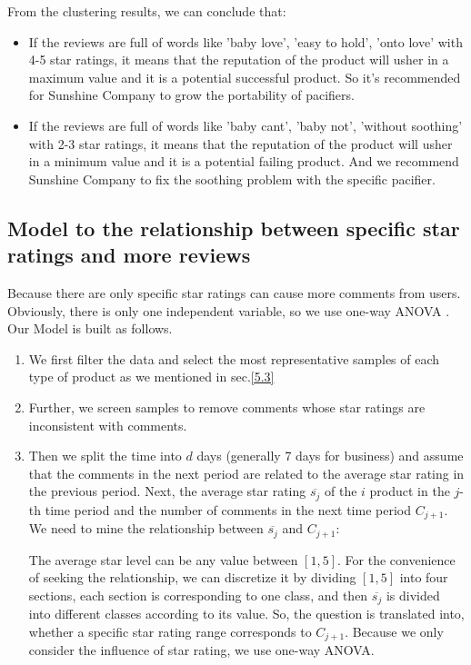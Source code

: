 \documentclass{mcmthesis}
\begin{document}
From the clustering results, we can conclude that:
\begin{itemize}
	\item If the reviews are full of words like 'baby love', 'easy to hold', 'onto love' with 4-5 star ratings, it means that the reputation of the product will usher in a maximum value and it is a potential successful product. So it's recommended for Sunshine Company to grow the portability of pacifiers.
	\item If the reviews are full of words like 'baby cant', 'baby not', 'without soothing' with 2-3 star ratings, it means that the reputation of the product will usher in a minimum value and it is a potential failing product. And we recommend Sunshine Company to fix the soothing problem with the specific pacifier.
\end{itemize}
\subsection{Model to the relationship between specific star ratings and more reviews}
Because there are only specific star ratings can cause more comments from users. Obviously, there is only one independent variable, so we use one-way ANOVA \cite{ross2017one}. Our Model is built as follows.\\
\begin{enumerate}
	\item We first filter the data and select the most representative samples of each type of product as we mentioned in sec.\ref{5.3}
	\item Further, we screen samples to remove comments whose star ratings are inconsistent with comments.
	\item Then we split the time into $d $ days (generally 7 days for business) and assume that the comments in the next period are related to the average star rating in the previous period. Next, the average star rating $\overline{s_j} $ of the $i $ product in the $j$-th time period and the number of comments in the next time period $C_{j + 1} $. We need to mine the relationship between $\overline{s_j} $ and $C_{j + 1} $:

	The average star level can be any value between $[1,5] $. For the convenience of seeking the relationship, we can discretize it by dividing $[1,5] $ into four sections, each section is corresponding to one class, and then $\overline{s_j} $ is divided into different classes according to its value. So, the question is translated into, whether a specific star rating range corresponds to $C_{j + 1} $. Because we only consider the influence of star rating, we use one-way ANOVA.
\end{enumerate}
\end{document}
